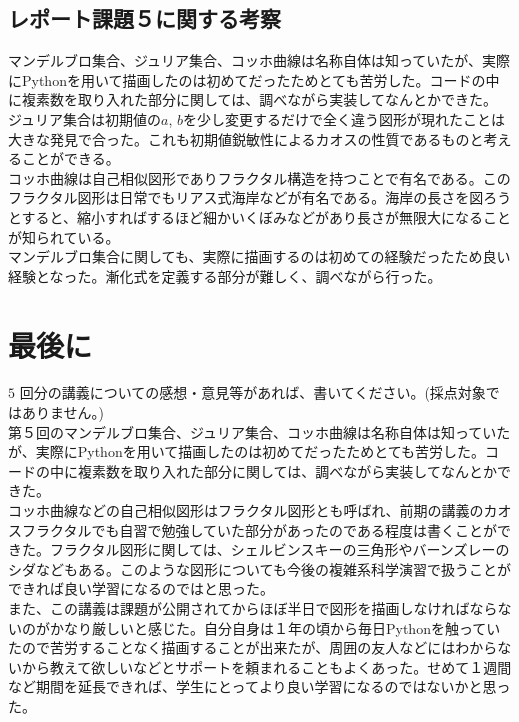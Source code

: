 \documentclass[a4j]{jsarticle}
\begin{document}
\newpage

\subsection{レポート課題５に関する考察}
マンデルブロ集合、ジュリア集合、コッホ曲線は名称自体は知っていたが、実際にPythonを用いて描画したのは初めてだったためとても苦労した。コードの中に複素数を取り入れた部分に関しては、調べながら実装してなんとかできた。\\
ジュリア集合は初期値の$a$, $b$を少し変更するだけで全く違う図形が現れたことは大きな発見で合った。これも初期値鋭敏性によるカオスの性質であるものと考えることができる。\\
コッホ曲線は自己相似図形でありフラクタル構造を持つことで有名である。このフラクタル図形は日常でもリアス式海岸などが有名である。海岸の長さを図ろうとすると、縮小すればするほど細かいくぼみなどがあり長さが無限大になることが知られている。\\
マンデルブロ集合に関しても、実際に描画するのは初めての経験だったため良い経験となった。漸化式を定義する部分が難しく、調べながら行った。\\

\newpage

\section{最後に}
$5$ 回分の講義についての感想・意見等があれば、書いてください。(採点対象ではありません。)\\

第５回のマンデルブロ集合、ジュリア集合、コッホ曲線は名称自体は知っていたが、実際にPythonを用いて描画したのは初めてだったためとても苦労した。コードの中に複素数を取り入れた部分に関しては、調べながら実装してなんとかできた。\\
コッホ曲線などの自己相似図形はフラクタル図形とも呼ばれ、前期の講義のカオスフラクタルでも自習で勉強していた部分があったのである程度は書くことができた。フラクタル図形に関しては、シェルビンスキーの三角形やバーンズレーのシダなどもある。このような図形についても今後の複雑系科学演習で扱うことができれば良い学習になるのではと思った。\\
また、この講義は課題が公開されてからほぼ半日で図形を描画しなければならないのがかなり厳しいと感じた。自分自身は１年の頃から毎日Pythonを触っていたので苦労することなく描画することが出来たが、周囲の友人などにはわからないから教えて欲しいなどとサポートを頼まれることもよくあった。せめて１週間など期間を延長できれば、学生にとってより良い学習になるのではないかと思った。\\
\end{document}
